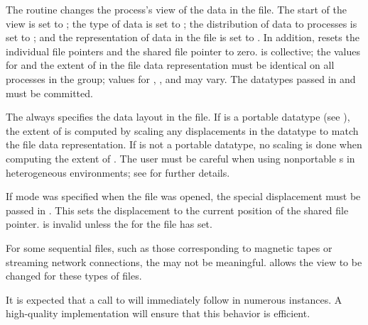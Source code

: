 The  routine changes the process's view
of the data in the file.
The start of the view is set to ;
the type of data is set to ;
the distribution of data to processes is set to ;
and the representation of data in the file is set to .
In addition,
 resets the individual file pointers and the
shared file pointer to zero.
 is collective;
the values for  and
the extent of  in the file data representation
must be identical on all processes
in the group;
values for , , and  may vary.
The datatypes passed in  and  must
be committed.

The  always specifies the data layout in the file.
If  is a portable datatype (see ),
the extent of  is computed by scaling any displacements
in the datatype to match the file data representation.
If  is not a portable datatype,
no scaling is done when computing the extent of .
The user must be careful when using nonportable s
in heterogeneous environments;
see  for further details.

If  mode was specified when the file was opened,
the special displacement  must be
passed in .
This sets the displacement to the current position
of the shared file pointer.
 is invalid unless the 
for the
file has  set.  

\begin{rationale}
For some sequential files,
such as those corresponding to magnetic tapes or streaming network connections,
the  may not be meaningful.
 allows the view to be changed
for these types of files.
\end{rationale}

\begin{implementors}
It is expected that a call to 
will immediately follow
 in numerous instances.
A high-quality implementation will ensure that this behavior is efficient.
\end{implementors}

